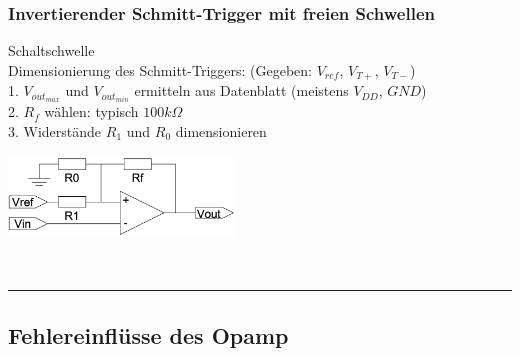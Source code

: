         \subsubsection{Invertierender Schmitt-Trigger mit freien Schwellen}
        \begin{minipage}[T]{13cm}
            Schaltschwelle
            \hspace{20.8mm}\\
            
            Dimensionierung des Schmitt-Triggers: (Gegeben: $V_{ref}$, $V_{T+}$, $V_{T-}$)\\
            1. $V_{out_{max}}$ und $V_{out_{min}}$ ermitteln aus Datenblatt (meistens $V_{DD}$, $GND$)\\
            2. $R_f$ w\"ahlen: typisch $100 k\Omega$\\
            3. Widerst\"ande $R_1$ und $R_0$ dimensionieren\\
        \end{minipage} 
        \begin{minipage}{6cm}
            \includegraphics[width=6cm]{./images/i-schmittFreieSchwellen.png} 
        \end{minipage}\\
    \hrule

	\subsection{Fehlereinflüsse des Opamp}
